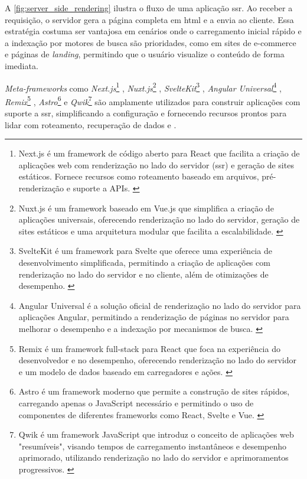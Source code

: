A \autoref{fig:server_side_rendering} ilustra o fluxo de uma aplicação \acrshort{ssr}. Ao receber a requisição, o servidor gera a página completa em \acrshort{html} e a envia ao cliente. Essa estratégia costuma ser vantajosa em cenários onde o carregamento inicial rápido e a indexação por motores de busca são prioridades, como em sites de e-commerce e páginas de \emph{landing}, permitindo que o usuário visualize o conteúdo de forma imediata. 



\emph{Meta-\-frameworks} como \emph{Next.js}\footnote{Next.js é um framework de código aberto para React que facilita a criação de aplicações web com renderização no lado do servidor (\acrshort{ssr}) e geração de sites estáticos. Fornece recursos como roteamento baseado em arquivos, pré-renderização e suporte a APIs. \cite{nextjs2024}} , \emph{Nuxt.js}\footnote{Nuxt.js é um framework baseado em Vue.js que simplifica a criação de aplicações universais, oferecendo renderização no lado do servidor, geração de sites estáticos e uma arquitetura modular que facilita a escalabilidade. \cite{nuxtjs2024}} , \emph{SvelteKit}\footnote{SvelteKit é um framework para Svelte que oferece uma experiência de desenvolvimento simplificada, permitindo a criação de aplicações com renderização no lado do servidor e no cliente, além de otimizações de desempenho. \cite{sveltekit2024}} , \emph{Angular Universal}\footnote{Angular Universal é a solução oficial de renderização no lado do servidor para aplicações Angular, permitindo a renderização de páginas no servidor para melhorar o desempenho e a indexação por mecanismos de busca. \cite{angularuniversal2024}} , \emph{Remix}\footnote{Remix é um framework full-stack para React que foca na experiência do desenvolvedor e no desempenho, oferecendo renderização no lado do servidor e um modelo de dados baseado em carregadores e ações. \cite{remix2024}} , \emph{Astro}\footnote{Astro é um framework moderno que permite a construção de sites rápidos, carregando apenas o JavaScript necessário e permitindo o uso de componentes de diferentes frameworks como React, Svelte e Vue. \cite{astro2024}} e \emph{Qwik}\footnote{Qwik é um framework JavaScript que introduz o conceito de aplicações web "resumíveis", visando tempos de carregamento instantâneos e desempenho aprimorado, utilizando renderização no lado do servidor e aprimoramentos progressivos. \cite{qwik2024}} são amplamente utilizados para construir aplicações com suporte a \acrshort{ssr}, simplificando a configuração e fornecendo recursos prontos para lidar com roteamento, recuperação de dados e .

